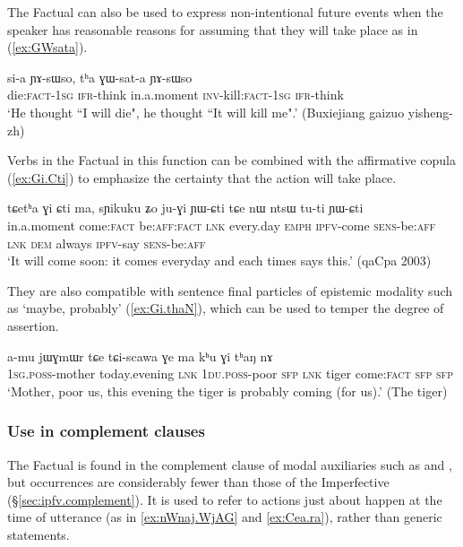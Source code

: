 The Factual can also be used to express non-intentional future events when the speaker has reasonable reasons for assuming that they will take place as in (\ref{ex:GWsata}). 

\begin{exe}
\ex \label{ex:GWsata}
\gll si-a ɲɤ-sɯso, tʰa ɣɯ-sat-a ɲɤ-sɯso \\
die:\textsc{fact}-\textsc{1sg} \textsc{ifr}-think in.a.moment \textsc{inv}-kill:\textsc{fact}-\textsc{1sg} \textsc{ifr}-think \\
\glt `He thought ``I will die", he thought ``It will kill me".' (Buxiejiang gaizuo yisheng-zh)
\end{exe}

Verbs in the Factual in this function can be combined with the affirmative copula  (\ref{ex:Gi.Cti}) to emphasize the certainty that the action will take place. 

\begin{exe}
\ex \label{ex:Gi.Cti}
\gll tɕetʰa ɣi ɕti ma, sɲikuku ʑo ju-ɣi ɲɯ-ɕti tɕe nɯ ntsɯ tu-ti ɲɯ-ɕti \\
 in.a.moment come:\textsc{fact} be:\textsc{aff}:\textsc{fact} \textsc{lnk} every.day \textsc{emph} \textsc{ipfv}-come \textsc{sens}-be:\textsc{aff} \textsc{lnk} \textsc{dem} always \textsc{ipfv}-say \textsc{sens}-be:\textsc{aff} \\
\glt `It will come  soon: it comes everyday and each times says this.' (qaCpa 2003)
\end{exe}

They are also compatible with sentence final particles of epistemic modality such as  `maybe, probably' (\ref{ex:Gi.thaN}), which can be used to temper the degree of assertion.

\begin{exe}
\ex \label{ex:Gi.thaN}
\gll a-mu jɯɣmɯr tɕe tɕi-scawa ɣe ma kʰu ɣi tʰaŋ nɤ \\
 \textsc{1sg}.\textsc{poss}-mother today.evening \textsc{lnk}  \textsc{1du}.\textsc{poss}-poor \textsc{sfp} \textsc{lnk} tiger  come:\textsc{fact} \textsc{sfp} \textsc{sfp} \\
\glt `Mother, poor us, this evening the tiger is probably coming (for us).' (The tiger)
\end{exe}

\subsubsection{Use in complement clauses} \label{sec:fact.complement}
The Factual is found in the complement clause of modal auxiliaries such as  and , but occurrences are considerably fewer than those of the Imperfective (§\ref{sec:ipfv.complement}). It is used to refer to actions just about happen at the time of utterance (as in \ref{ex:nWnaj.WjAG} and \ref{ex:Cea.ra}), rather than generic statements.


